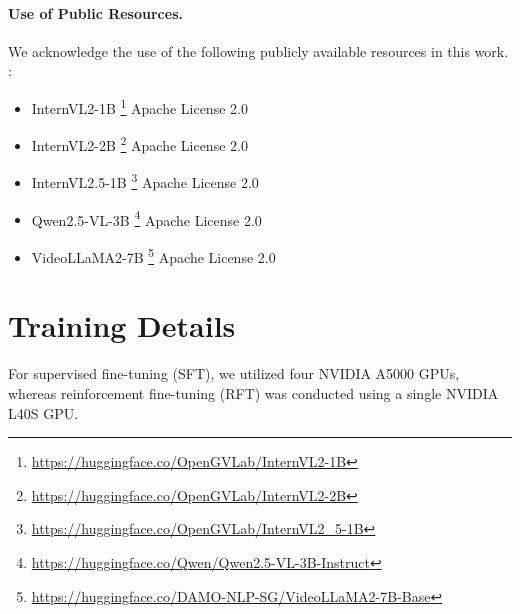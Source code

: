 \documentclass{article}
\begin{document}
\paragraph{Use of Public Resources.}
We acknowledge the use of the following publicly available resources in this work. :

\begin{itemize}

    \item InternVL2-1B \footnote{\url{https://huggingface.co/OpenGVLab/InternVL2-1B}} \dotfill Apache License 2.0

    \item InternVL2-2B \footnote{\url{https://huggingface.co/OpenGVLab/InternVL2-2B}} \dotfill Apache License 2.0

    \item InternVL2.5-1B \footnote{\url{https://huggingface.co/OpenGVLab/InternVL2_5-1B}} \dotfill Apache License 2.0

    \item Qwen2.5-VL-3B \footnote{\url{https://huggingface.co/Qwen/Qwen2.5-VL-3B-Instruct}} \dotfill Apache License 2.0

    \item VideoLLaMA2-7B \footnote{\url{https://huggingface.co/DAMO-NLP-SG/VideoLLaMA2-7B-Base}} \dotfill Apache License 2.0

\end{itemize}


\clearpage
\section{Training Details}
\label{appendix:hyperparams}

For supervised fine-tuning (SFT), we utilized four NVIDIA A5000 GPUs, whereas reinforcement fine-tuning (RFT) was conducted using a single NVIDIA L40S GPU.
\end{document}
